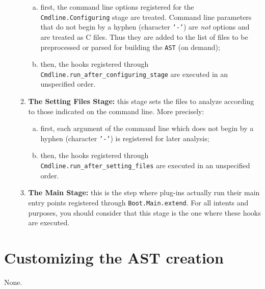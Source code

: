 \begin{enumerate}[A --]
\begin{enumerate}[1.]
  \begin{enumerate}[(a)]
  \item first, the command line options registered for the
    \texttt{Cmdline.Configuring} stage
    are treated. Command line parameters that do not begin by a hyphen
    (character \texttt{'-'}) are \emph{not} options and are treated as
    \textsf{C} files. Thus they are added to the list of files to be
    preprocessed or parsed for building the \texttt{AST} (on demand);
  \item then, the hooks registered through
    \texttt{Cmdline.run\_after\_configuring\_stage}
     are executed
    in an unspecified order.
  \end{enumerate}

\item \textbf{The Setting Files Stage:} this stage sets the \C files to analyze
  according to those indicated on the command line. More precisely:

  \begin{enumerate}[(a)]
  \item first, each argument of the command line which does not begin by a
    hyphen (character \texttt{'-'}) is registered for later analysis;
  \item then, the hooks registered through
    \texttt{Cmdline.run\_after\_setting\_files}
     are executed in an
    unspecified order.
  \end{enumerate}

\item \textbf{The Main Stage:} this is the step where plug-ins actually run
  their main entry points registered through
  \texttt{Boot.Main.extend}. For all intents and purposes, you should consider
  that this stage is the one where these hooks are executed.

\end{enumerate}

\end{enumerate}


\section{Customizing the AST creation}\label{sec:customizing-ast}
\begin{prereq}
  None.
\end{prereq}

